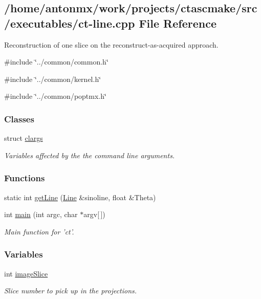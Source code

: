 \hypertarget{ct-line_8cpp}{
\subsection{/home/antonmx/work/projects/ctascmake/src/executables/ct-\/line.cpp File Reference}
\label{ct-line_8cpp}
}


Reconstruction of one slice on the reconstruct-\/as-\/acquired approach.  


{\ttfamily \#include \char`\"{}../common/common.h\char`\"{}}\par
{\ttfamily \#include \char`\"{}../common/kernel.h\char`\"{}}\par
{\ttfamily \#include \char`\"{}../common/poptmx.h\char`\"{}}\par
\subsubsection*{Classes}
\begin{DoxyCompactItemize}
\item 
struct \hyperlink{structclargs}{clargs}
\begin{DoxyCompactList}\small\item\em Variables affected by the the command line arguments. \item\end{DoxyCompactList}\end{DoxyCompactItemize}
\subsubsection*{Functions}
\begin{DoxyCompactItemize}
\item 
static int \hyperlink{ct-line_8cpp_a7818f5daf3081e78709d748b8a48f699}{getLine} (\hyperlink{group__Types_ga4ce3fdeba27702c8b09a141e22709e38}{Line} \&sinoline, float \&Theta)
\item 
int \hyperlink{ct-line_8cpp_a0ddf1224851353fc92bfbff6f499fa97}{main} (int argc, char $\ast$argv\mbox{[}$\,$\mbox{]})
\begin{DoxyCompactList}\small\item\em Main function for 'ct'. \item\end{DoxyCompactList}\end{DoxyCompactItemize}
\subsubsection*{Variables}
\begin{DoxyCompactItemize}
\item 
int \hyperlink{ct-line_8cpp_a0663364dad71a6874dd86b6403a9827e}{imageSlice}
\begin{DoxyCompactList}\small\item\em Slice number to pick up in the projections. \item\end{DoxyCompactList}\end{DoxyCompactItemize}


